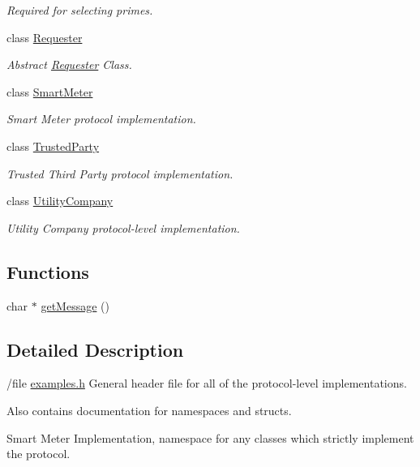 \begin{DoxyCompactItemize}
\begin{DoxyCompactList}\small\item\em Required for selecting primes. \end{DoxyCompactList}\item 
class \hyperlink{classSMImp_1_1Requester}{Requester}
\begin{DoxyCompactList}\small\item\em Abstract \hyperlink{classSMImp_1_1Requester}{Requester} Class. \end{DoxyCompactList}\item 
class \hyperlink{classSMImp_1_1SmartMeter}{Smart\+Meter}
\begin{DoxyCompactList}\small\item\em Smart Meter protocol implementation. \end{DoxyCompactList}\item 
class \hyperlink{classSMImp_1_1TrustedParty}{Trusted\+Party}
\begin{DoxyCompactList}\small\item\em Trusted Third Party protocol implementation. \end{DoxyCompactList}\item 
class \hyperlink{classSMImp_1_1UtilityCompany}{Utility\+Company}
\begin{DoxyCompactList}\small\item\em Utility Company protocol-\/level implementation. \end{DoxyCompactList}\end{DoxyCompactItemize}
\subsection*{Functions}
\begin{DoxyCompactItemize}
\item 
char $\ast$ \hyperlink{namespaceSMImp_ae98f8d04b5f3a4aab78f52b64bbb3530}{get\+Message} ()
\end{DoxyCompactItemize}


\subsection{Detailed Description}
/file \hyperlink{examples_8h}{examples.\+h} General header file for all of the protocol-\/level implementations.

Also contains documentation for namespaces and structs.

Smart Meter Implementation, namespace for any classes which strictly implement the protocol. 

